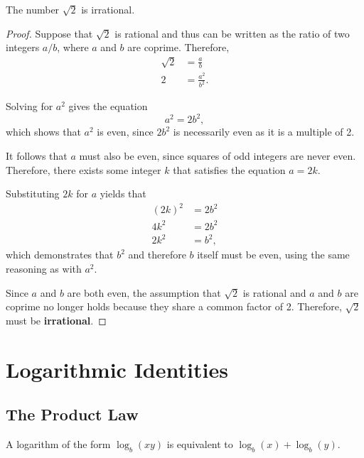\documentclass[parskip, headings=standardclasses]{scrartcl}
\begin{document}
\begin{theorem}
  The number \(\sqrt{2}\) is irrational.
\end{theorem}

\begin{proof}
  Suppose that \(\sqrt{2}\) is rational and thus can be written as the ratio of
  two integers \(a/b\), where \(a\) and \(b\) are coprime. Therefore,
  \begin{align*}
    \sqrt{2} &= \frac{a}{b} \\
    2 &= \frac{a^{2}}{b^{2}}.
  \end{align*}

  Solving for \(a^{2}\) gives the equation
  \begin{equation*}
    a^{2} = 2b^{2},
  \end{equation*}
  which shows that \(a^{2}\) is even, since \(2b^{2}\) is necessarily even as it
  is a multiple of 2.

  It follows that \(a\) must also be even, since squares of odd integers are
  never even. Therefore, there exists some integer \(k\) that satisfies the
  equation \(a = 2k\).

  Substituting \(2k\) for \(a\) yields that
  \begin{align*}
    {(2k)}^{2} &= 2b^{2} \\
    4k^{2} &= 2b^{2} \\
    2k^{2} &= b^{2},
  \end{align*}
  which demonstrates that \(b^{2}\) and therefore \(b\) itself must be even,
  using the same reasoning as with \(a^{2}\).

  Since \(a\) and \(b\) are both even, the assumption that \(\sqrt{2}\) is
  rational and \(a\) and \(b\) are coprime no longer holds because they share a
  common factor of 2. Therefore, \(\sqrt{2}\) must be \textbf{irrational}.
\end{proof}

\section{Logarithmic Identities}

\subsection{The Product Law}

\begin{theorem}
  A logarithm of the form \(\log_{b}(xy)\) is equivalent to \(\log_{b}(x) +
  \log_{b}(y)\).
\end{theorem}
\end{document}
